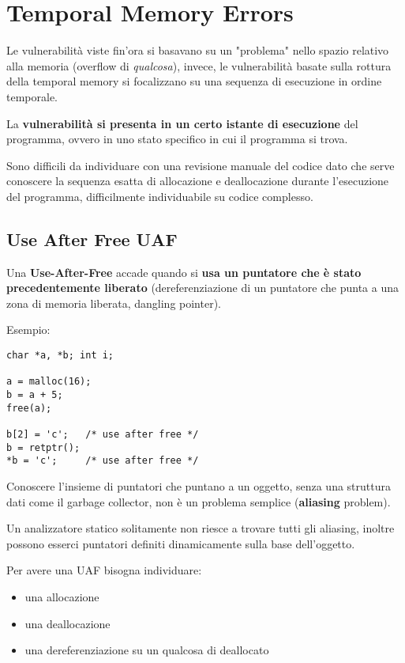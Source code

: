 \section{Temporal Memory Errors}

Le vulnerabilità viste fin'ora si basavano su un "problema" nello spazio relativo alla memoria (overflow di \textit{qualcosa}), invece, le vulnerabilità basate sulla rottura della temporal memory si focalizzano su una sequenza di esecuzione in ordine temporale. 

La \textbf{vulnerabilità si presenta in un certo istante di esecuzione} del programma, ovvero in uno stato specifico in cui il programma si trova.

Sono difficili da individuare con una revisione manuale del codice dato che serve conoscere la sequenza esatta di allocazione e deallocazione durante l'esecuzione del programma, difficilmente individuabile su codice complesso.

\subsection{Use After Free UAF}

Una \textbf{Use-After-Free} accade quando si \textbf{usa un puntatore che è stato precedentemente liberato} (dereferenziazione di un puntatore che punta a una zona di memoria liberata, dangling pointer).

Esempio: 
\begin{verbatim}
char *a, *b; int i;

a = malloc(16);
b = a + 5;
free(a);

b[2] = 'c';   /* use after free */
b = retptr();
*b = 'c';     /* use after free */
\end{verbatim}

Conoscere l'insieme di puntatori che puntano a un oggetto, senza una struttura dati come il garbage collector, non è un problema semplice (\textbf{aliasing} problem). 

Un analizzatore statico solitamente non riesce a trovare tutti gli aliasing, inoltre possono esserci puntatori definiti dinamicamente sulla base dell'oggetto.

Per avere una UAF bisogna individuare: 
\begin{itemize}
	\item una allocazione
	
    \item una deallocazione
	
    \item una dereferenziazione su un qualcosa di deallocato
\end{itemize}

